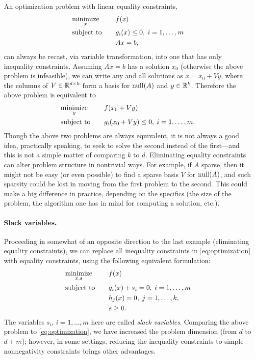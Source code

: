 \begin{Example}
An optimization problem with linear equality constraints,
\begin{alignat*}{2}
&\operatorname*{minimize}_x \quad && f(x) \\
&\operatorname{subject\,\,to} \quad && g_i(x) \leq 0, \; i=1,\ldots,m \\ 
& && Ax = b, 
\end{alignat*}
can always be recast, via variable transformation, into one that has only
inequality constraints. Assuming $Ax = b$ has a solution $x_0$ (otherwise the
above problem is infeasible), we can write any and all solutions as $x = x_0 +
Vy$, where the columns of $V \in \mathbb{R}^{d \times k}$ form a basis for $\operatorname{null}(A)$ and  
$y \in \mathbb{R}^k$. Therefore the above problem is equivalent to 
\begin{alignat*}{2}
&\operatorname*{minimize}_y \quad && f(x_0+Vy) \\
&\operatorname{subject\,\,to} \quad && g_i(x_0+Vy) \leq 0, \; i=1,\ldots,m.
\end{alignat*}
Though the above two problems are always equivalent, it is not always a good
idea, practically speaking, to seek to solve the second instead of the
first---and this is not a simple matter of comparing $k$ to $d$. Eliminating
equality constraints can alter problem structure in nontrivial ways. For
example, if $A$ sparse, then it might not be easy (or even possible) to find a
sparse basis $V$ for $\operatorname{null}(A)$, and such sparsity could be lost in moving
from the first problem to the second. This could make a big difference in
practice, depending on the specifics (the size of the problem, the algorithm 
one has in mind for computing a solution, etc.).
\end{Example}

\paragraph{Slack variables.} 

Proceeding in somewhat of an opposite direction to the last example (eliminating
equality constraints), we can replace all inequality constraints in
\eqref{eq:optimization} with equality constraints, using the following
equivalent formulation: 
\begin{alignat*}{2}
&\operatorname*{minimize}_{x,s} \quad && f(x) \\
&\operatorname{subject\,\,to} \quad && g_i(x) + s_i = 0, \; i=1,\ldots,m \\ 
& && h_j(x) = 0, \; j=1,\ldots,k, \\
& && s \geq 0.
\end{alignat*}
The variables $s_i$, $i=1,\ldots,m$ here are called \emph{slack variables}. 
Comparing the above problem to \eqref{eq:optimization}, we have increased the
problem dimension (from $d$ to $d+m$); however, in some settings, reducing the
inequality constraints to simple nonnegativity constraints brings other
advantages.

